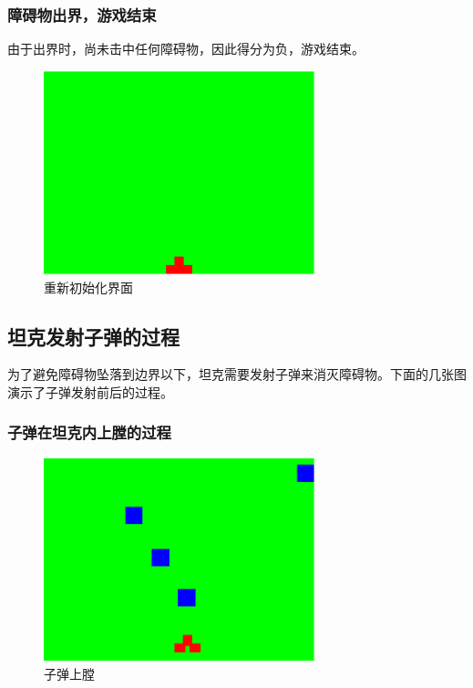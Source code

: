 \subsubsection{障碍物出界，游戏结束}
由于出界时，尚未击中任何障碍物，因此得分为负，游戏结束。
\begin{figure}[H]
  \centering
  \includegraphics[width=0.7\textwidth]{img/new.png}
  \caption{重新初始化界面
  }\label{fig:new}
\end{figure}

\subsection{坦克发射子弹的过程}
为了避免障碍物坠落到边界以下，坦克需要发射子弹来消灭障碍物。下面的几张图演示了子弹发射前后的过程。\\

\subsubsection{子弹在坦克内上膛的过程}
\begin{figure}[H]
  \centering
  \includegraphics[width=0.7\textwidth]{img/shot1.png}
  \caption{子弹上膛
  }\label{fig:shot1}
\end{figure}


